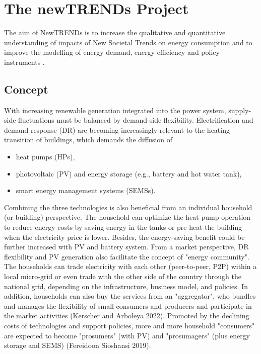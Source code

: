 \chapter{The newTRENDs Project} 

The aim of NewTRENDs is to increase the qualitative and quantitative understanding of impacts of New Societal Trends on energy consumption and to improve the modelling of energy demand, energy efficiency and policy instruments \cite{fraunhofer}. 

\section{Concept}


With increasing renewable generation integrated into the power system, supply-side fluctuations must be balanced by demand-side flexibility. 
Electrification and demand response (DR) are becoming increasingly relevant to the heating transition of buildings, which demands the diffusion of

\begin{itemize}
  \item heat pumps (HPs),
  \item photovoltaic (PV) and energy storage (e.g., battery and hot water tank),
  \item smart energy management systems (SEMSs).
\end{itemize}

Combining the three technologies is also beneficial from an individual household (or building) perspective. The household can optimize the heat pump operation to reduce energy costs by saving energy in the tanks or pre-heat the building when the electricity price is lower. Besides, the energy-saving benefit could be further increased with PV and battery system.
From a market perspective, DR flexibility and PV generation also facilitate the concept of "energy community". The households can trade electricity with each other (peer-to-peer, P2P) within a local micro-grid or even trade with the other side of the country through the national grid, depending on the infrastructure, business model, and policies. In addition, households can also buy the services from an "aggregator", who bundles and manages the flexibility of small consumers and producers and participate in the market activities (Kerscher and Arboleya 2022). 
Promoted by the declining costs of technologies and support policies, more and more household "consumers" are expected to become "prosumers" (with PV) and "prosumagers" (plus energy storage and SEMS) (Fereidoon Sioshansi 2019).


